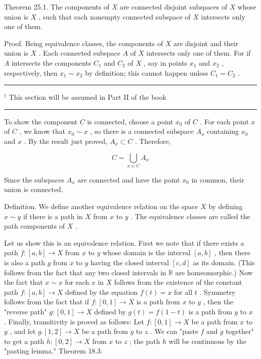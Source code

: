 \documentclass[10pt]{article}
\newcommand{\HRule}{\begin{center}\rule{0.9\linewidth}{0.2mm}\end{center}}
\begin{document}
Theorem 25.1. The components of \(X\) are connected disjoint subspaces of \(X\) whose union is \(X\) , such that each nonempty connected subspace of \(X\) intersects only one of them.

Proof. Being equivalence classes, the components of \(X\) are disjoint and their union is \(X\) . Each connected subspace \(A\) of \(X\) intersects only one of them. For if \(A\) intersects the components \({C}_{1}\) and \({C}_{2}\) of \(X\) , say in points \({x}_{1}\) and \({x}_{2}\) , respectively, then \({x}_{1} \sim  {x}_{2}\) by definition; this cannot happen unless \({C}_{1} = {C}_{2}\) .

\HRule

\({}^{ \dagger  }\) This section will be assumed in Part II of the book

\HRule

To show the component \(C\) is connected, choose a point \({x}_{0}\) of \(C\) . For each point \(x\) of \(C\) , we know that \({x}_{0} \sim  x\) , so there is a connected subspace \({A}_{x}\) containing \({x}_{0}\) and \(x\) . By the result just proved, \({A}_{x} \subset  C\) . Therefore,

\[
C = \mathop{\bigcup }\limits_{{x \in  C}}{A}_{x}
\]

Since the subspaces \({A}_{x}\) are connected and have the point \({x}_{0}\) in common, their union is connected.

Definition. We define another equivalence relation on the space \(X\) by defining \(x \sim  y\) if there is a path in \(X\) from \(x\) to \(y\) . The equivalence classes are called the path components of \(X\) .

Let us show this is an equivalence relation. First we note that if there exists a path \(f : \left\lbrack  {a,b}\right\rbrack   \rightarrow  X\) from \(x\) to \(y\) whose domain is the interval \(\left\lbrack  {a,b}\right\rbrack\) , then there is also a path \(g\) from \(x\) to \(y\) having the closed interval \(\left\lbrack  {c,d}\right\rbrack\) as its domain. (This follows from the fact that any two closed intervals in \(\mathbb{R}\) are homeomorphic.) Now the fact that \(x \sim  x\) for each \(x\) in \(X\) follows from the existence of the constant path \(f : \left\lbrack  {a,b}\right\rbrack   \rightarrow  X\) defined by the equation \(f\left( t\right)  = x\) for all \(t\) . Symmetry follows from the fact that if \(f : \left\lbrack  {0,1}\right\rbrack   \rightarrow  X\) is a path from \(x\) to \(y\) , then the "reverse path" \(g : \left\lbrack  {0,1}\right\rbrack   \rightarrow  X\) defined by \(g\left( t\right)  = f\left( {1 - t}\right)\) is a path from \(y\) to \(x\) . Finally, transitivity is proved as follows: Let \(f : \left\lbrack  {0,1}\right\rbrack   \rightarrow  X\) be a path from \(x\) to \(y\) , and let \(g.\left\lbrack  {1,2}\right\rbrack   \rightarrow  X\) be a path from \(y\) to \(z\) . We can "paste \(f\) and \(g\) together" to get a path \(h : \left\lbrack  {0,2}\right\rbrack   \rightarrow  X\) from \(x\) to \(z\) ; the path \(h\) will be continuous by the "pasting lemma." Theorem 18.3.
\end{document}
